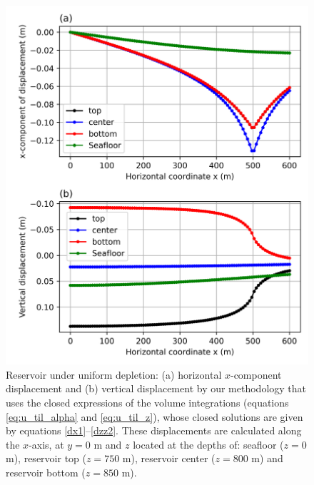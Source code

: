 \documentclass[P]{BrJG_submit}
\begin{document}
\begin{figure}[h]
    \centering
    \includegraphics[scale=0.40]{figures/Figure_Displacement_z_levels.png}
    \caption{Reservoir under uniform depletion: (a) horizontal $x$-component displacement and (b) vertical 
	displacement by our methodology that uses the closed expressions of the volume integrations (equations 
	\ref{eq:u_til_alpha} and \ref{eq:u_til_z}), whose closed solutions are given by equations \ref{dx1}--\ref{dzz2}.
	These displacements are calculated along the $x$-axis, at $y = 0$ m and $z$ located at the depths of:  
	seafloor ($z = 0$ m), reservoir top ($z = 750$ m), reservoir center ($z = 800$ m) 	and reservoir bottom ($z = 850$ m).}
	\label{fig:displacement_z_levels}
\end{figure} 
\end{document}
